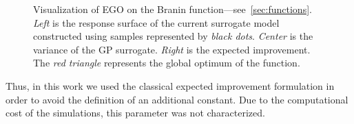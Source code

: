 \begin{figure}[!ht]               
\centering
{}
   
\caption{Visualization of EGO on the Branin function---see~\cref{sec:functions}. \emph{Left} is the response surface of the current surrogate model constructed using samples represented by \emph{black dots}. \emph{Center} is the variance of the GP surrogate. \emph{Right} is the expected improvement. The \emph{red triangle} represents the global optimum of the function.}
\label{fig:branin_ego}
\end{figure}

Thus, in this work we used the classical expected improvement formulation in order to avoid the definition of an additional constant. Due to the computational cost of the simulations, this parameter was not characterized.

